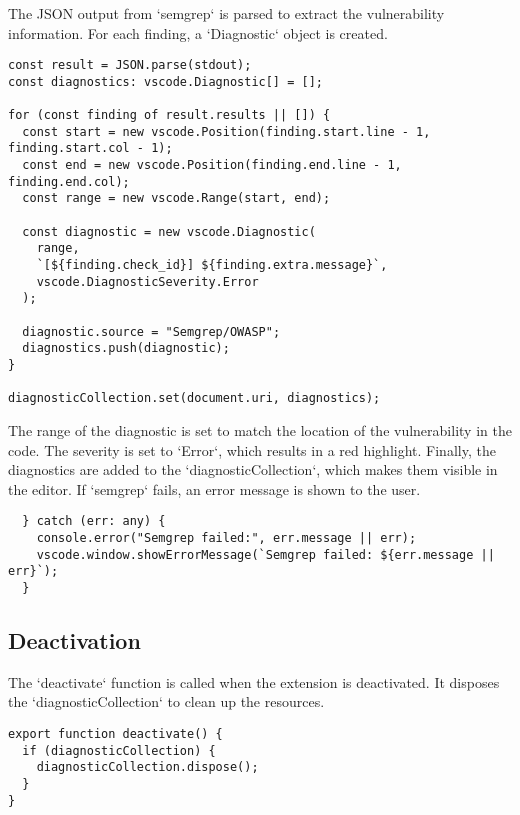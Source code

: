 The JSON output from `semgrep` is parsed to extract the vulnerability information. For each finding, a `Diagnostic` object is created.

\begin{verbatim}
const result = JSON.parse(stdout);
const diagnostics: vscode.Diagnostic[] = [];

for (const finding of result.results || []) {
  const start = new vscode.Position(finding.start.line - 1, finding.start.col - 1);
  const end = new vscode.Position(finding.end.line - 1, finding.end.col);
  const range = new vscode.Range(start, end);

  const diagnostic = new vscode.Diagnostic(
    range,
    `[${finding.check_id}] ${finding.extra.message}`,
    vscode.DiagnosticSeverity.Error
  );

  diagnostic.source = "Semgrep/OWASP";
  diagnostics.push(diagnostic);
}

diagnosticCollection.set(document.uri, diagnostics);
\end{verbatim}

The range of the diagnostic is set to match the location of the vulnerability in the code. The severity is set to `Error`, which results in a red highlight. Finally, the diagnostics are added to the `diagnosticCollection`, which makes them visible in the editor. If `semgrep` fails, an error message is shown to the user.

\begin{verbatim}
  } catch (err: any) {
    console.error("Semgrep failed:", err.message || err);
    vscode.window.showErrorMessage(`Semgrep failed: ${err.message || err}`);
  }
\end{verbatim}

\subsection{Deactivation}

The `deactivate` function is called when the extension is deactivated. It disposes the `diagnosticCollection` to clean up the resources.

\begin{verbatim}
export function deactivate() {
  if (diagnosticCollection) {
    diagnosticCollection.dispose();
  }
}
\end{verbatim}